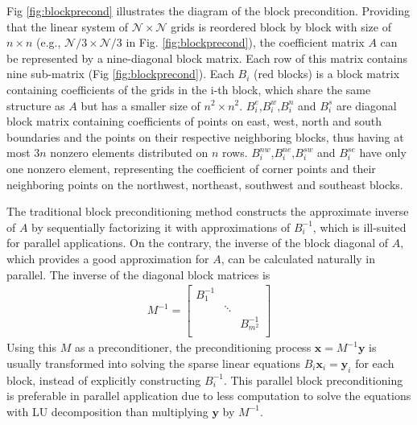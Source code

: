 Fig \ref{fig:blockprecond} illustrates the diagram of the block precondition.
Providing that the linear system of $\mathcal{N} \times \mathcal{N}$ grids is reordered block by block with size of $n\times n$
(e.g., $\mathcal{N}/3\times \mathcal{N}/3$ in Fig. \ref{fig:blockprecond}),
the coefficient matrix $A$ can be represented by a nine-diagonal block matrix. 
Each row of this matrix contains nine sub-matrix (Fig \ref{fig:blockprecond}). %
Each $B_i$ (red blocks) is a block matrix containing coefficients of the grids in the i-th block, which share the same structure as $A$ but has a smaller size of $n^2\times n^2$. 
$B_i^e$,$B_i^w$,$B_i^n$ and $B_i^s$ are diagonal block matrix containing coefficients of points on east, west, north and south boundaries
and the points on their respective neighboring blocks, thus having at most $3n$ nonzero elements distributed on $n$ rows. 
$B_i^{nw}$,$B_i^{ne}$,$B_i^{sw}$ and $B_i^{se}$ have only one nonzero element, representing the coefficient of corner points
and their neighboring points on the northwest, northeast, southwest and southeast blocks. 

The traditional block preconditioning method constructs the approximate inverse of $A$ by sequentially factorizing it with approximations of $B_i^{-1}$,
which is ill-suited for parallel applications. 
On the contrary, the inverse of the block diagonal of $A$, which provides a good approximation for $A$, can be calculated naturally in parallel.
The inverse of the diagonal block matrices is  
\begin{eqnarray*}
M^{-1}=    \left [
        \begin{array}{ccccccc}
        B_1^{-1} &   &  \\
         & \ddots&  \\
        &   &  B_{m^2}^{-1} \\
    \end{array}
    \right ]
\end{eqnarray*}
Using this $M$ as a preconditioner, the preconditioning process $\textbf{x} = M^{-1}\textbf{y}$ is usually transformed into solving the sparse linear equations $B_i \textbf{x}_i = \textbf{y}_i$ for each block,
instead of explicitly constructing $B_i^{-1}$.
This parallel block preconditioning is preferable in parallel application due to less computation to solve the equations with LU decomposition
than multiplying $\textbf{y}$ by $M^{-1}$. 


